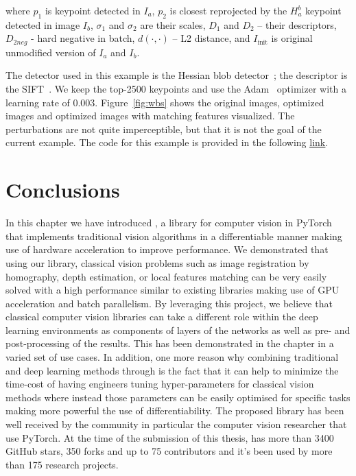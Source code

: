\noindent where $p_1$ is keypoint detected in $I_a$, $p_2$ is closest reprojected by the $H_a^b$ keypoint detected in image $I_b$, $\sigma_1$ and $\sigma_2$ are their scales, $D_1$ and $D_2$ -- their descriptors, $D_{2neg}$ - hard negative in batch, $d(\cdot, \cdot)$ -- L2 distance, and $I_{\text{init}}$ is original unmodified version of $I_a$ and $I_b$.

The detector used in this example is the Hessian blob detector~\citep{Hessian78}; the descriptor is the SIFT~\citep{Lowe2004}. We keep the top-2500 keypoints and use the Adam~\citep{adam2015} optimizer with a learning rate of 0.003. 
Figure~\ref{fig:wbs} shows the original images, optimized images and optimized images with matching features visualized.  The perturbations are not quite imperceptible, but that it is not the goal of the current example. The code for this example is provided in the following \underline{\color{blue}\href{https://github.com/kornia/kornia-examples/blob/master/local-feature-adversarial-attack.ipynb}{link}}.

\section{Conclusions}
In this chapter we have introduced \lib, a library for computer vision in PyTorch that implements traditional vision algorithms in a differentiable manner making use of hardware acceleration to improve performance. We demonstrated that using our library, classical vision problems such as image registration by homography, depth estimation, or local features matching can be very easily solved with a high performance similar to existing libraries making use of GPU acceleration and batch parallelism. By leveraging this project, we believe that classical computer vision libraries can take a different role within the deep learning environments as components of layers of the networks as well as pre- and post-processing of the results. This has been demonstrated in the chapter in a varied set of use cases. In addition, one more reason why combining traditional and deep learning methods through \lib{} is the fact that it can help to minimize the time-cost of having engineers tuning hyper-parameters for classical vision methods where instead those parameters can be easily optimised for specific tasks making more powerful the use of differentiability. The proposed library has been well received by the community in particular the computer vision researcher that use PyTorch. At the time of the submission of this thesis, \lib{} has more than 3400 GitHub stars, 350 forks and up to 75 contributors and it's been used by more than 175 research projects.